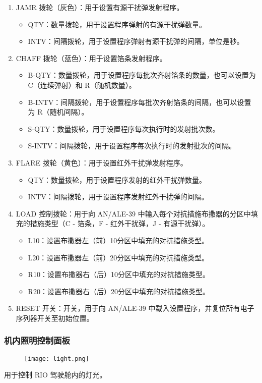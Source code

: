 \begin{enumerate}
  \item JAMR 拨轮（灰色）：用于设置有源干扰弹发射程序。
  \begin{itemize}
    \item QTY：数量拨轮，用于设置程序弹射的有源干扰弹数量。
    \item INTV：间隔拨轮，用于设置程序弹射有源干扰弹的间隔，单位是秒。
  \end{itemize}
  \item CHAFF 拨轮（蓝色）：用于设置箔条发射程序。
  \begin{itemize}
    \item B-QTY：数量拨轮，用于设置程序每批次齐射箔条的数量，也可以设置为 C（连续弹射）和 R（随机数量）。
    \item B-INTV：间隔拨轮，用于设置程序每批次齐射箔条的间隔，也可以设置为 R（随机间隔）。
    \item S-QTY：数量拨轮，用于设置程序每次执行时的发射批次数。
    \item S-INTV：间隔拨轮，用于设置程序每次执行时的发射批次的间隔。
  \end{itemize}
  \item FLARE 拨轮（黄色）：用于设置红外干扰弹发射程序。
  \begin{itemize}
    \item QTY：数量拨轮，用于设置程序发射的红外干扰弹数量。
    \item INTV：间隔拨轮，用于设置程序发射红外干扰弹的间隔。
  \end{itemize}
  \item LOAD 控制拨轮：用于向 AN/ALE-39 中输入每个对抗措施布撒器的分区中填充的措施类型（C - 箔条，F - 红外干扰弹，J - 有源干扰弹）。
  \begin{itemize}
    \item L10：设置布撒器左（前）10分区中填充的对抗措施类型。
    \item L20：设置布撒器左（前）20分区中填充的对抗措施类型。
    \item R10：设置布撒器右（后）10分区中填充的对抗措施类型。
    \item R20：设置布撒器右（后）20分区中填充的对抗措施类型。
  \end{itemize}
  \item RESET 开关：开关，用于向 AN/ALE-39 中载入设置程序，并复位所有电子序列器开关至初始位置。
\end{enumerate}

\subsubsection{机内照明控制面板}
\begin{figure}[htb]
  \center
  \texttt{[image: light.png]}
\end{figure}
用于控制 RIO 驾驶舱内的灯光。

